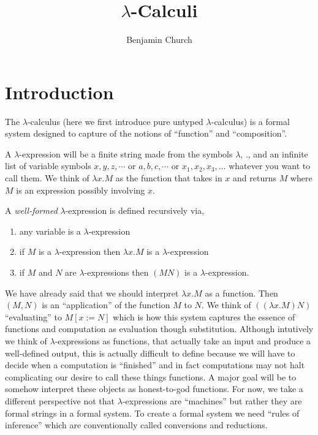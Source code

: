 \documentclass[12pt]{article}
\begin{document}
\author{Benjamin Church}
\title{\Huge $\lambda$-Calculi}

\section{Introduction}


The $\lambda$-calculus (here we first introduce pure untyped $\lambda$-calculus) is a formal system designed to capture of the notions of ``function'' and ``composition''.

\begin{rmk}
A $\lambda$-expression will be a finite string made from the symbols $\lambda$, $.$, and an infinite list of variable symbols $x, y, z, \cdots$ or $a,b,c, \cdots$ or $x_1, x_2, x_3, \dots$ whatever you want to call them. We think of $\lambda x . M$ as the function that takes in $x$ and returns $M$ where $M$ is an expression possibly involving $x$. 
\end{rmk} 

\begin{defn}
A \textit{well-formed} $\lambda$-expression is defined recursively via,
\begin{enumerate}
\item any variable is a $\lambda$-expression
\item if $M$ is a $\lambda$-expression then $\lambda x . M$ is a $\lambda$-expression
\item if $M$ and $N$ are $\lambda$-expressions then $(M N)$ is a $\lambda$-expression.
\end{enumerate}
\end{defn}

\begin{rmk}
We have already said that we should interpret $\lambda x . M$ as a function. Then $(M, N)$ is an ``application'' of the function $M$ to $N$. We think of $((\lambda x . M) N)$ ``evaluating'' to $M[x := N]$ which is how this system captures the essence of functions and computation as evaluation though substitution. Although intutively we think of $\lambda$-expressions as functions, that actually take an input and produce a well-defined output, this is actually difficult to define because we will have to decide when a computation is ``finished'' and in fact computations may not halt complicating our desire to call these things functions. A major goal will be to somehow interpret these objects as honest-to-god functions. For now, we take a different perspective not that $\lambda$-expressions are ``machines'' but rather they are formal strings in a formal system. To create a formal system we need ``rules of inference'' which are conventionally called conversions and reductions.
\end{rmk}
\end{document}
